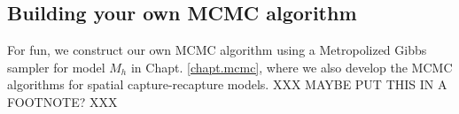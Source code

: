 \subsection{Building your own MCMC algorithm}

For fun, we construct our own MCMC algorithm using a Metropolized
Gibbs sampler for model $M_{h}$ in Chapt. \ref{chapt.mcmc}, where we
also develop the MCMC 
algorithms for spatial capture-recapture models.
XXX MAYBE PUT THIS IN A FOOTNOTE? XXX

